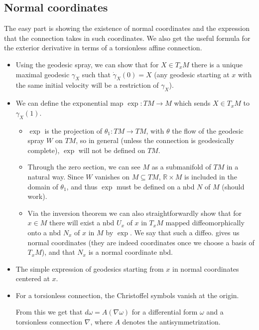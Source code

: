 \documentclass{report}
\theoremstyle{definition}
\begin{document}
\subsection{Normal coordinates}

The easy part is showing the existence of normal coordinates and the expression that the connection takes in such coordinates. We also get the useful formula for the exterior derivative in terms of a torsionless affine connection.
\begin{itemize}
    \item Using the geodesic spray, we can show that for $X\in T_xM$ there is a unique maximal geodesic $\gamma_X$ such that $\dot{\gamma}_X(0)=X$ (any geodesic starting at $x$ with the same initial velocity will be a restriction of $\gamma_X$).
    \item We can define the exponential map $\exp:TM\to M$ which sends $X\in T_xM$ to $\gamma_X(1)$.
    \begin{itemize}
        \item $\exp$ is the projection of $\theta_1:TM\to TM$, with $\theta$ the flow of the geodesic spray $W$ on $TM$, so in general (unless the connection is geodesically complete), $\exp$ will not be defined on $TM$.
        \item Through the zero section, we can see $M$ as a submanifold of $TM$ in a natural way. Since $W$ vanishes on $M\subseteq TM$, $\mathbb{R}\times M$ is included in the domain of $\theta_1$, and thus $\exp$ must be defined on a nbd $N$ of $M$ (should work).
        \item Via the inversion theorem we can also straightforwardly show that for $x\in M$ there will exist a nbd $U_x$ of $x$ in $T_xM$ mapped diffeomorphically onto a nbd $N_x$ of $x$ in $M$ by $\exp$. We say that such a diffeo. gives us normal coordinates (they are indeed coordinates once we choose a basis of $T_xM$), and that $N_x$ is a normal coordinate nbd.
    \end{itemize}
    \item The simple expression of geodesics starting from $x$ in normal coordinates centered at $x$.
    \item For a torsionless connection, the Christoffel symbols vanish at the origin.

    From this we get that $d\omega=A(\nabla\omega)$ for a differential form $\omega$ and a torsionless connection $\nabla$, where $A$ denotes the antisymmetrization.
\end{itemize}
\end{document}

